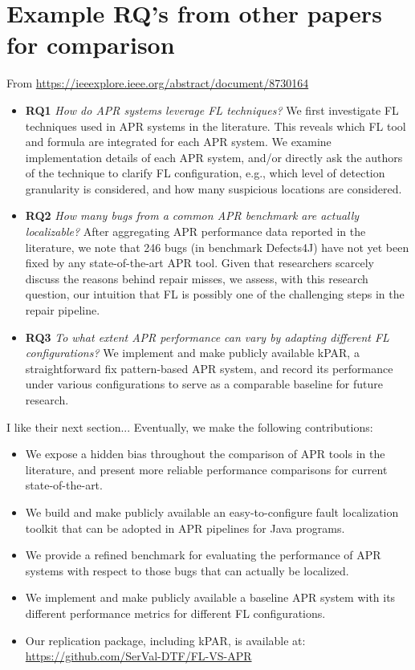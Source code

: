     
\section{Example RQ's from other papers for comparison}

From \url{https://ieeexplore.ieee.org/abstract/document/8730164}
\begin{itemize}
    \item \textbf{RQ1} \textit{How do APR systems leverage FL techniques?} We first investigate FL techniques used in APR systems in the literature. This reveals which FL tool and formula are integrated for each APR system. We examine implementation details of each APR system, and/or directly ask the authors of the technique to clarify FL configuration, e.g., which level of detection granularity is considered, and how many suspicious locations are considered.
    \item \textbf{RQ2} \textit{How many bugs from a common APR benchmark are actually localizable?} After aggregating APR performance data reported in the literature, we note that 246 bugs (in benchmark Defects4J) have not yet been fixed by any state-of-the-art APR tool. Given that researchers scarcely discuss the reasons behind repair misses, we assess, with this research question, our intuition that FL is possibly one of the challenging steps in the repair pipeline.
    \item \textbf{RQ3} \textit{To what extent APR performance can vary by adapting different FL configurations?} We implement and make publicly available kPAR, a straightforward fix pattern-based APR system, and record its performance under various configurations to serve as a comparable baseline for future research.
\end{itemize}

I like their next section...
Eventually, we make the following contributions:

\begin{itemize}
    \item We expose a hidden bias throughout the comparison of APR tools in the literature, and present more reliable performance comparisons for current state-of-the-art.
    \item We build and make publicly available an easy-to-configure fault localization toolkit that can be adopted in APR pipelines for Java programs.
    \item We provide a refined benchmark for evaluating the performance of APR systems with respect to those bugs that can actually be localized.
    \item We implement and make publicly available a baseline APR system with its different performance metrics for different FL configurations.
    \item Our replication package, including kPAR, is available at: \url{https://github.com/SerVal-DTF/FL-VS-APR}
\end{itemize}



